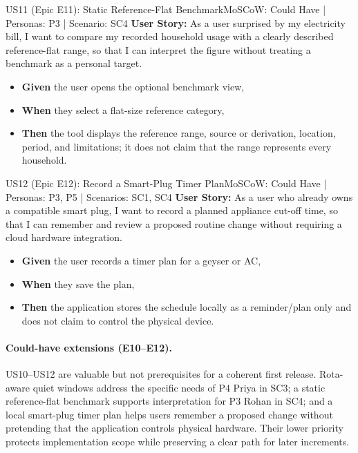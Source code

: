 \documentclass[12pt,a4paper]{article}
\begin{document}
\begin{storybox}{US11 (Epic E11): Static Reference-Flat Benchmark}{MoSCoW: Could Have | Personas: P3 | Scenario: SC4}
\textbf{User Story:} As a user surprised by my electricity bill, I want to compare my recorded household usage with a clearly described reference-flat range, so that I can interpret the figure without treating a benchmark as a personal target.
\begin{itemize}
    \item \textbf{Given} the user opens the optional benchmark view,
    \item \textbf{When} they select a flat-size reference category,
    \item \textbf{Then} the tool displays the reference range, source or derivation, location, period, and limitations; it does not claim that the range represents every household.
\end{itemize}
\end{storybox}

\begin{storybox}{US12 (Epic E12): Record a Smart-Plug Timer Plan}{MoSCoW: Could Have | Personas: P3, P5 | Scenarios: SC1, SC4}
\textbf{User Story:} As a user who already owns a compatible smart plug, I want to record a planned appliance cut-off time, so that I can remember and review a proposed routine change without requiring a cloud hardware integration.
\begin{itemize}
    \item \textbf{Given} the user records a timer plan for a geyser or AC,
    \item \textbf{When} they save the plan,
    \item \textbf{Then} the application stores the schedule locally as a reminder/plan only and does not claim to control the physical device.
\end{itemize}
\end{storybox}

\paragraph{Could-have extensions (E10--E12).}
US10--US12 are valuable but not prerequisites for a coherent first release. Rota-aware quiet windows address the specific needs of P4 Priya in SC3; a static reference-flat benchmark supports interpretation for P3 Rohan in SC4; and a local smart-plug timer plan helps users remember a proposed change without pretending that the application controls physical hardware. Their lower priority protects implementation scope while preserving a clear path for later increments.
\end{document}
